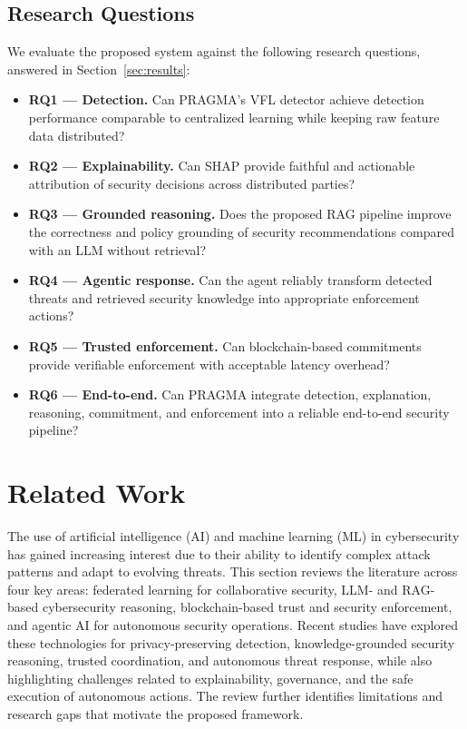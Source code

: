 \documentclass[10pt, conference]{IEEEtran}
\begin{document}
\subsection{Research Questions}
\label{sec:rqs}
We evaluate the proposed system against the following research questions, answered in Section~\ref{sec:results}:
\begin{itemize}
  \item \textbf{RQ1 --- Detection.} Can PRAGMA's VFL detector achieve detection performance comparable to centralized learning while keeping raw feature data distributed?
  \item \textbf{RQ2 --- Explainability.} Can SHAP provide faithful and actionable attribution of security decisions across distributed parties?
  \item \textbf{RQ3 --- Grounded reasoning.} Does the proposed RAG pipeline improve the correctness and policy grounding of security recommendations compared with an LLM without retrieval?
  \item \textbf{RQ4 --- Agentic response.} Can the agent reliably transform detected threats and retrieved security knowledge into appropriate enforcement actions?
  \item \textbf{RQ5 --- Trusted enforcement.} Can blockchain-based commitments provide verifiable enforcement with acceptable latency overhead?
  \item \textbf{RQ6 --- End-to-end.} Can PRAGMA integrate detection, explanation, reasoning, commitment, and enforcement into a reliable end-to-end security pipeline?
\end{itemize}

\section{Related Work}
\label{sec:related}
The use of artificial intelligence (AI) and machine learning (ML) in cybersecurity has gained increasing interest due to their ability to identify complex attack patterns and adapt to evolving threats. This section reviews the literature across four key areas: federated learning for collaborative security, LLM- and RAG-based cybersecurity reasoning, blockchain-based trust and security enforcement, and agentic AI for autonomous security operations. Recent studies have explored these technologies for privacy-preserving detection, knowledge-grounded security reasoning, trusted coordination, and autonomous threat response, while also highlighting challenges related to explainability, governance, and the safe execution of autonomous actions. The review further identifies limitations and research gaps that motivate the proposed framework.
\end{document}
